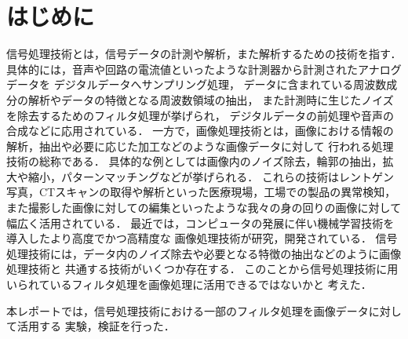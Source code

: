 \chapter{はじめに}


信号処理技術とは，信号データの計測や解析，また解析するための技術を指す．
具体的には，音声や回路の電流値といったような計測器から計測されたアナログデータを
デジタルデータへサンプリング処理，
データに含まれている周波数成分の解析やデータの特徴となる周波数領域の抽出，
また計測時に生じたノイズを除去するためのフィルタ処理が挙げられ，
デジタルデータの前処理や音声の合成などに応用されている．
一方で，画像処理技術とは，画像における情報の解析，抽出や必要に応じた加工などのような画像データに対して
行われる処理技術の総称である．
具体的な例としては画像内のノイズ除去，輪郭の抽出，拡大や縮小，パターンマッチングなどが挙げられる．
これらの技術はレントゲン写真，CTスキャンの取得や解析といった医療現場，工場での製品の異常検知，
また撮影した画像に対しての編集といったような我々の身の回りの画像に対して幅広く活用されている．
最近では，コンピュータの発展に伴い機械学習技術を導入したより高度でかつ高精度な
画像処理技術が研究，開発されている．
信号処理技術には，データ内のノイズ除去や必要となる特徴の抽出などのように画像処理技術と
共通する技術がいくつか存在する．
このことから信号処理技術に用いられているフィルタ処理を画像処理に活用できるではないかと
考えた．

本レポートでは，信号処理技術における一部のフィルタ処理を画像データに対して活用する
実験，検証を行った．
